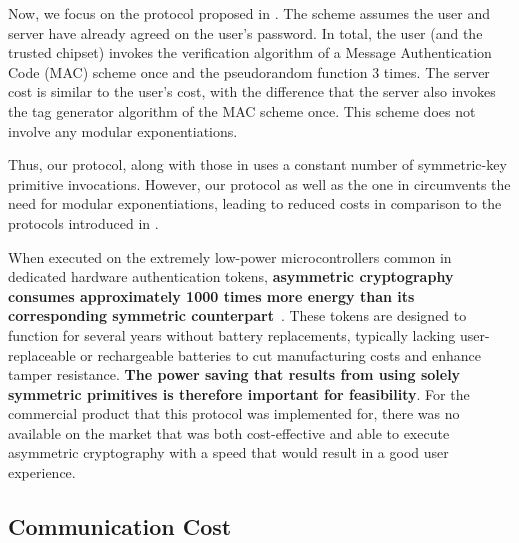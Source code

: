 Now, we focus on the protocol proposed in \cite{MatsuoMY11}. The scheme assumes the user and server have already agreed on the user's password. 
%
In total, the user (and the trusted chipset) invokes the verification algorithm of a Message Authentication Code (MAC) scheme once and the pseudorandom function $3$ times. The server cost is similar to the user's cost, with the difference that the server also invokes the tag generator algorithm of the MAC scheme once. This scheme does not involve any modular exponentiations. 

Thus,  our protocol, along with those in \cite{WangW18,JareckiJKSS21,MatsuoMY11} uses a constant number of symmetric-key primitive invocations. However, our protocol as well as the one in \cite{MatsuoMY11} circumvents the need for modular exponentiations, leading to reduced costs in comparison to the protocols introduced in  \cite{WangW18,JareckiJKSS21}.

When executed on the extremely low-power microcontrollers common in dedicated hardware authentication tokens, \textbf{asymmetric cryptography consumes approximately 1000 times more energy than its corresponding symmetric counterpart}~\cite{energyconsumption}. These tokens are designed to function for several years without battery replacements, typically lacking user-replaceable or rechargeable batteries to cut manufacturing costs and enhance tamper resistance. \textbf{The power saving that results from using solely symmetric primitives is therefore important for feasibility}.
For the commercial product that this protocol was implemented for, there was no available on the market that was both cost-effective and able to execute asymmetric cryptography with a speed that would result in a good user experience.




\vspace{-1.8mm}
\subsection{Communication Cost}
\vspace{-.3mm}

